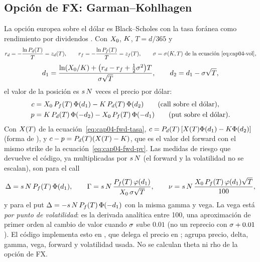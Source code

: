 \subsection{Opción de FX: Garman--Kohlhagen}\label{sec:cap04-gk}

La opción europea sobre el dólar es Black--Scholes con la tasa foránea como rendimiento por dividendos
\citep{garman1983,black1973}. Con $X_0$, $K$, $T=d/365$ y
\begin{equation}\label{eq:cap04-tasas}
  r_d = -\frac{\ln P_{d}(T)}{T} = z_{d}(T),\qquad r_f = -\frac{\ln P_{f}(T)}{T} = z_{f}(T),\qquad
  \sigma=\sigma(K,T)\ \text{de la ecuación~\eqref{eq:cap04-vol}},
\end{equation}
\begin{equation}\label{eq:cap04-d1d2}
  d_1=\frac{\ln(X_0/K)+\bigl(r_d-r_f+\tfrac12\sigma^2\bigr)T}{\sigma\sqrt T},\qquad d_2=d_1-\sigma\sqrt T,
\end{equation}
el valor de la posición es $s\,N$ veces el precio por dólar:
\begin{align}
  c &= X_0\,P_{f}(T)\,\Phi(d_1) - K\,P_{d}(T)\,\Phi(d_2) \qquad\text{(call sobre el dólar)},
      \label{eq:cap04-gk-call}\\
  p &= K\,P_{d}(T)\,\Phi(-d_2) - X_0\,P_{f}(T)\,\Phi(-d_1) \qquad\text{(put sobre el dólar)}.
      \label{eq:cap04-gk-put}
\end{align}
Con $X(T)$ de la ecuación~\eqref{eq:cap04-fwd-tasa}, $c=P_{d}(T)\,[X(T)\Phi(d_1)-K\Phi(d_2)]$
(forma de \citealt{black1976}), y $c-p=P_{d}(T)(X(T)-K)$, que es el valor del forward con el mismo strike
de la ecuación~\eqref{eq:cap04-fwd-pv}. Las medidas de riesgo que devuelve el código, ya multiplicadas por
$s\,N$ (el forward y la volatilidad no se escalan), son para el call
\begin{equation}\label{eq:cap04-gk-griegas}
  \Delta = s\,N\,P_{f}(T)\,\Phi(d_1),\qquad
  \Gamma = s\,N\,\frac{P_{f}(T)\,\varphi(d_1)}{X_0\,\sigma\sqrt T},\qquad
  \nu = s\,N\,\frac{X_0\,P_{f}(T)\,\varphi(d_1)\sqrt T}{100},
\end{equation}
y para el put $\Delta=-s\,N\,P_{f}(T)\,\Phi(-d_1)$ con la misma gamma y vega. La vega está \emph{por punto
de volatilidad}: es la derivada analítica entre 100, una aproximación de primer orden al cambio de valor
cuando $\sigma$ sube $0.01$ (no un reprecio con $\sigma+0.01$). El código implementa esto en
, que delega el precio en
; 
agrupa precio, delta, gamma, vega, forward y volatilidad usada. No se calculan theta ni rho de la opción de FX.

